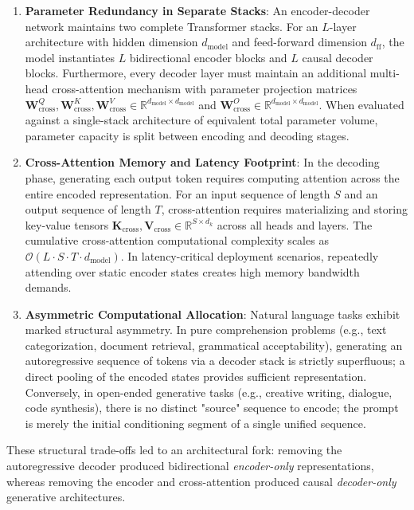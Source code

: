 \documentclass[../../main.tex]{subfiles}
\begin{document}
\begin{enumerate}
    \item \textbf{Parameter Redundancy in Separate Stacks}: An encoder-decoder network maintains two complete Transformer stacks. For an $L$-layer architecture with hidden dimension $d_{\text{model}}$ and feed-forward dimension $d_{\text{ff}}$, the model instantiates $L$ bidirectional encoder blocks and $L$ causal decoder blocks. Furthermore, every decoder layer must maintain an additional multi-head cross-attention mechanism with parameter projection matrices $\mathbf{W}^Q_{\text{cross}}, \mathbf{W}^K_{\text{cross}}, \mathbf{W}^V_{\text{cross}} \in \mathbb{R}^{d_{\text{model}} \times d_{\text{model}}}$ and $\mathbf{W}^O_{\text{cross}} \in \mathbb{R}^{d_{\text{model}} \times d_{\text{model}}}$. When evaluated against a single-stack architecture of equivalent total parameter volume, parameter capacity is split between encoding and decoding stages.
    
    \item \textbf{Cross-Attention Memory and Latency Footprint}: In the decoding phase, generating each output token requires computing attention across the entire encoded representation. For an input sequence of length $S$ and an output sequence of length $T$, cross-attention requires materializing and storing key-value tensors $\mathbf{K}_{\text{cross}}, \mathbf{V}_{\text{cross}} \in \mathbb{R}^{S \times d_k}$ across all heads and layers. The cumulative cross-attention computational complexity scales as $\mathcal{O}(L \cdot S \cdot T \cdot d_{\text{model}})$. In latency-critical deployment scenarios, repeatedly attending over static encoder states creates high memory bandwidth demands.
    
    \item \textbf{Asymmetric Computational Allocation}: Natural language tasks exhibit marked structural asymmetry. In pure comprehension problems (e.g., text categorization, document retrieval, grammatical acceptability), generating an autoregressive sequence of tokens via a decoder stack is strictly superfluous; a direct pooling of the encoded states provides sufficient representation. Conversely, in open-ended generative tasks (e.g., creative writing, dialogue, code synthesis), there is no distinct "source" sequence to encode; the prompt is merely the initial conditioning segment of a single unified sequence.
\end{enumerate}

These structural trade-offs led to an architectural fork: removing the autoregressive decoder produced bidirectional \emph{encoder-only} representations, whereas removing the encoder and cross-attention produced causal \emph{decoder-only} generative architectures.
\end{document}
